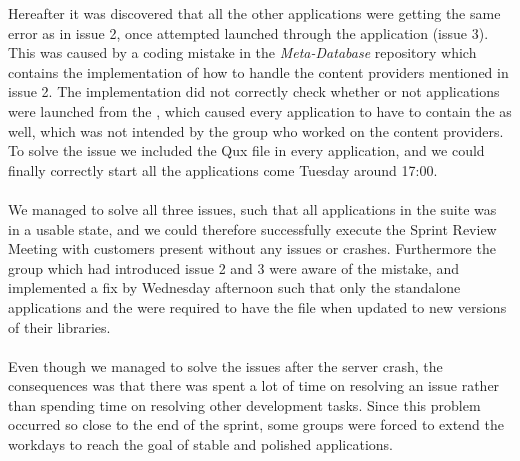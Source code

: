 Hereafter it was discovered that all the other applications were getting the same error as in issue 2, once attempted launched through the \launcher application (issue 3). This was caused by a coding mistake in the \emph{Meta-Database} repository which contains the implementation of how to handle the content providers mentioned in issue 2. The implementation did not correctly check whether or not applications were launched from the \launcher, which caused every application to have to contain the  as well, which was not intended by the group who worked on the content providers. To solve the issue we included the Qux file in every application, and we could finally correctly start all the applications come Tuesday around 17:00. 
\\\\
We managed to solve all three issues, such that all applications in the \giraf suite was in a usable state, and we could therefore successfully execute the Sprint Review Meeting with customers present without any issues or crashes. Furthermore the group which had introduced issue 2 and 3 were aware of the mistake, and implemented a fix by Wednesday afternoon such that only the standalone applications and the \launcher were required to have the  file when updated to new versions of their libraries.
\\\\
Even though we managed to solve the issues after the server crash, the consequences was that there was spent a lot of time on resolving an issue rather than spending time on resolving other development tasks. Since this problem occurred so close to the end of the sprint, some groups were forced to extend the workdays to reach the goal of stable and polished applications.
